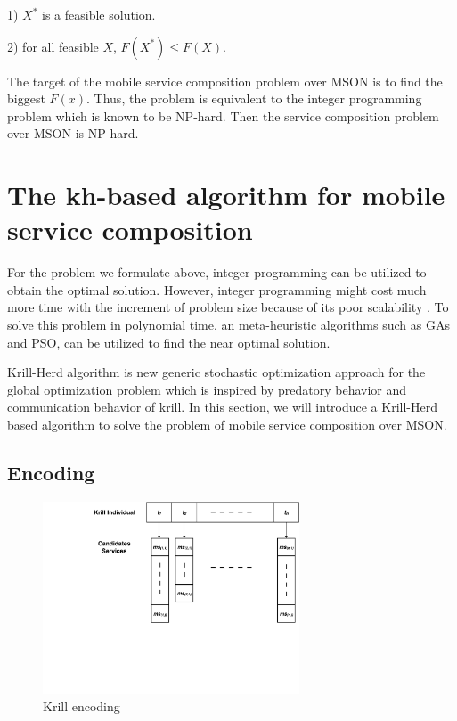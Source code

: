 \documentclass[10pt,journal,compsoc]{IEEEtran}
\begin{document}
1) $X^*$ is a feasible solution.

​2) for all feasible $X$, $F(X^*) \le F(X)$. 

The target of the mobile service composition problem over MSON is to find the biggest $F(x)$. Thus, the problem is equivalent to the integer programming problem which is known to be NP-hard. Then the service composition problem over MSON is NP-hard.

\section{The kh-based algorithm for mobile service composition}
For the problem we formulate above, integer programming can be utilized to obtain the optimal solution. However, integer programming might cost much more time with the increment of problem size because of its poor scalability \cite{nemhauser1988integer}. To solve this problem in polynomial time, an meta-heuristic algorithms such as GAs and PSO, can be utilized to find the near optimal solution.

Krill-Herd algorithm \cite{gandomi2012krill} is new generic stochastic optimization approach for the global optimization problem which is inspired by predatory behavior and communication behavior of krill. 
In this section, we will introduce a Krill-Herd based algorithm to solve the problem of mobile service composition over MSON.


\subsection{Encoding}

\begin{figure}[!t]
\centering
\includegraphics[width=3in]{./img/pic4.pdf}
\caption{Krill encoding}
\label{fig_opportunistic}
\end{figure}
\end{document}
